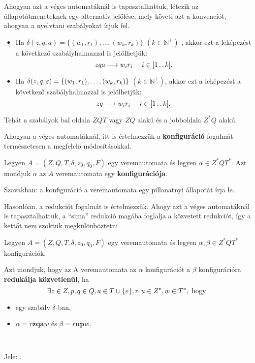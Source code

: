 Ahogyan azt a véges automatáknál is tapasztalhattuk, létezik az állapotátmeneteknek egy alternatív jelölése, mely követi azt a konvenciót, ahogyan a nyelvtani szabályokat írjuk fel.

\begin{itemize}
	\item Ha $\delta(z,q,a) = \{(w_1,r_1),\dots,(w_k,r_k)\}$ $(k \in \mathbb{N}^+)$ , akkor ezt a leképezést a következő szabályhalmazzal is jelölhetjük:
	\[ zqa \longrightarrow w_i r_i ~~~~ i \in [1 \operatorname{..} k]. \]
	\item Ha $\delta(z,q,\varepsilon) = \{(w_1,r_1),\dots, (w_k,r_k)\}$ $(k \in \mathbb{N}^+)$, akkor ezt a leképezést a következő szabályhalmazzal is jelölhetjük:
	\[ zq \longrightarrow w_i r_i ~~~~ i \in [1 \operatorname{..} k]. \]
\end{itemize}

Tehát a szabályok bal oldala $ZQT$ vagy $ZQ$ alakú és a jobboldala $Z^*Q$ alakú.

Ahogyan a véges automatáknál, itt is értelmezzük a \textbf{konfiguráció} fogalmát -- természetesen a megfelelő módosításokkal.

\begin{tcolorbox}
	\begin{definition}[Konfiguráció]
		Legyen $A = (Z, Q, T, \delta, z_0, q_0, F)$ egy veremautomata és
		legyen $\alpha \in Z^*QT^*$.
		Azt mondjuk $\alpha$ az $A$ veremautomata egy \textbf{konfigurációja}.
	\end{definition}
\end{tcolorbox}

Szavakban: a konfiguráció a veremautomata egy pillanatnyi állapotát írja le.

Hasonlóan, a redukciót fogalmát is értelmezzük. Ahogy azt a véges automatáknál is tapasztalhattuk, a ``sima'' redukció magába foglalja a közvetett redukciót, így a kettőt nem szoktuk megkülönböztetni.

\begin{tcolorbox}
	\begin{definition}
		Legyen $A = (Z, Q, T, \delta, z_0, q_0, F)$ egy veremautomata és
		legyen $\alpha, \beta \in Z^*QT^*$ konfigurációk.
		
		Azt mondjuk, hogy az A veremautomata az $\alpha$ konfigurációt
		a $\beta$ konfigurációra \textbf{redukálja közvetlenül}, ha
		\[ \exists z \in Z, p, q \in Q, a \in T\cup\{\varepsilon\}, r,u \in Z^*, w \in T^*, \text{ hogy } \]
		\begin{itemize}
			\item {} egy szabály $\delta$-ban,
			\item $\alpha = r\textbf{zqa}w$ és $\beta = r\textbf{up}w$.
		\end{itemize}
		~
		
		Jele:  .
	\end{definition}
\end{tcolorbox}

